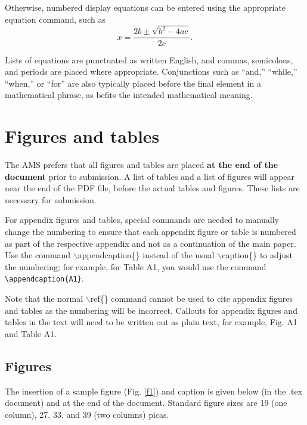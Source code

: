 \documentclass{ametsoc}
\begin{document}
Otherwise, numbered display equations can be entered using the appropriate
equation command, such as \begin{equation}
x=\frac{2b\pm\sqrt{b^{2}-4ac}}{2c}.  \end{equation}

Lists of equations are punctuated as written English, and commas, semicolons,
and periods are placed where appropriate. Conjunctions such as ``and,''
``while,'' ``when,'' or ``for'' are also typically placed before the final
element in a mathematical phrase, as befits the intended mathematical
meaning.  

\section{Figures and tables}
The AMS prefers that all figures and tables are placed {\bf at the end of the document} prior to submission. 
A list of tables and a list of figures will appear near the end of the PDF
file, before the actual tables and figures. These lists are necessary for submission.

For appendix figures and tables, special commands are needed to manually 
change the numbering to ensure that each appendix figure or table is numbered 
as part of the respective appendix and not as a continuation of the main paper. Use the command
$\backslash$appendcaption\{\} instead of the usual $\backslash$caption\{\} to adjust the 
numbering; for example, for Table A1, you would use the command \verb+\appendcaption{A1}+.

Note that the normal $\backslash$ref\{\} command cannot be used to cite 
appendix figures and tables as the numbering will be incorrect. Callouts for appendix figures 
and tables in the text will need to be written out as plain text, for example, Fig. A1 and Table A1.

\subsection{Figures}
The insertion of a sample figure (Fig. \ref{f1})  
and caption is given below (in the .tex document) and at the end of the document. Standard figure sizes are 19 (one column), 
27, 33, and 39 (two columns) picas.

%
\end{document}
